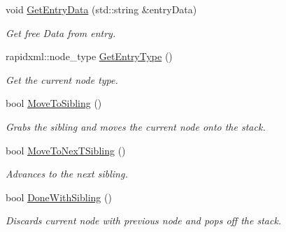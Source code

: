 \begin{DoxyCompactItemize}
\mbox{\label{classtestCaseHandler_1_1TestCaseParser_a70c34ea62f6013594ecae5c60d3dabbe}} 
void \mbox{\hyperlink{classtestCaseHandler_1_1TestCaseParser_a70c34ea62f6013594ecae5c60d3dabbe}{Get\+Entry\+Data}} (std\+::string \&entry\+Data)
\begin{DoxyCompactList}\small\item\em Get free Data from entry. \end{DoxyCompactList}\item 
\mbox{\label{classtestCaseHandler_1_1TestCaseParser_ac51ce8ebd10306a8365cbf666538e3b5}} 
rapidxml\+::node\+\_\+type \mbox{\hyperlink{classtestCaseHandler_1_1TestCaseParser_ac51ce8ebd10306a8365cbf666538e3b5}{Get\+Entry\+Type}} ()
\begin{DoxyCompactList}\small\item\em Get the current node type. \end{DoxyCompactList}\item 
\mbox{\label{classtestCaseHandler_1_1TestCaseParser_aee4b9c8a90f15124db068ce20e9f64b5}} 
bool \mbox{\hyperlink{classtestCaseHandler_1_1TestCaseParser_aee4b9c8a90f15124db068ce20e9f64b5}{Move\+To\+Sibling}} ()
\begin{DoxyCompactList}\small\item\em Grabs the sibling and moves the current node onto the stack. \end{DoxyCompactList}\item 
\mbox{\label{classtestCaseHandler_1_1TestCaseParser_acf359bb1dc2a8d7365577729d3b117bc}} 
bool \mbox{\hyperlink{classtestCaseHandler_1_1TestCaseParser_acf359bb1dc2a8d7365577729d3b117bc}{Move\+To\+Nex\+T\+Sibling}} ()
\begin{DoxyCompactList}\small\item\em Advances to the next sibling. \end{DoxyCompactList}\item 
\mbox{\label{classtestCaseHandler_1_1TestCaseParser_ad7e8870096aea92b099f51d558e52e8b}} 
bool \mbox{\hyperlink{classtestCaseHandler_1_1TestCaseParser_ad7e8870096aea92b099f51d558e52e8b}{Done\+With\+Sibling}} ()
\begin{DoxyCompactList}\small\item\em Discards current node with previous node and pops off the stack. \end{DoxyCompactList}\end{DoxyCompactItemize}


